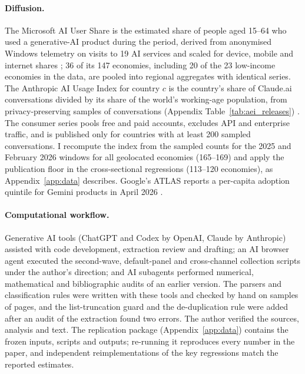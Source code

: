 \documentclass[11pt]{article}
\theoremstyle{definition}
\theoremstyle{remark}
\begin{document}
\paragraph{Diffusion.} The Microsoft AI User Share is the estimated share of people aged 15--64 who used a generative-AI product during the period, derived from anonymised Windows telemetry on visits to 19 AI services and scaled for device, mobile and internet shares \citep{misra2025measuring}; 36 of its 147 economies, including 20 of the 23 low-income economies in the data, are pooled into regional aggregates with identical series. The Anthropic AI Usage Index for country $c$ is the country's share of Claude.ai conversations divided by its share of the world's working-age population, from privacy-preserving samples of conversations (Appendix Table~\ref{tab:aei_releases}) \citep{handa2025which,appel2025uneven,appel2026primitives,massenkoff2026learning,massenkoff2026cadences,anthropic2026aei}. The consumer series pools free and paid accounts, excludes API and enterprise traffic, and is published only for countries with at least 200 sampled conversations. I recompute the index from the sampled counts for the 2025 and February 2026 windows for all geolocated economies (165--169) and apply the publication floor in the cross-sectional regressions (113--120 economies), as Appendix~\ref{app:data} describes. Google's ATLAS reports a per-capita adoption quintile for Gemini products in April 2026 \citep{iscenko2026atlas}.

\paragraph{Computational workflow.} Generative AI tools (ChatGPT and Codex by OpenAI, Claude by Anthropic) assisted with code development, extraction review and drafting; an AI browser agent executed the second-wave, default-panel and cross-channel collection scripts under the author's direction; and AI subagents performed numerical, mathematical and bibliographic audits of an earlier version. The parsers and classification rules were written with these tools and checked by hand on samples of pages, and the list-truncation guard and the de-duplication rule were added after an audit of the extraction found two errors. The author verified the sources, analysis and text. The replication package (Appendix~\ref{app:data}) contains the frozen inputs, scripts and outputs; re-running it reproduces every number in the paper, and independent reimplementations of the key regressions match the reported estimates.
\end{document}
